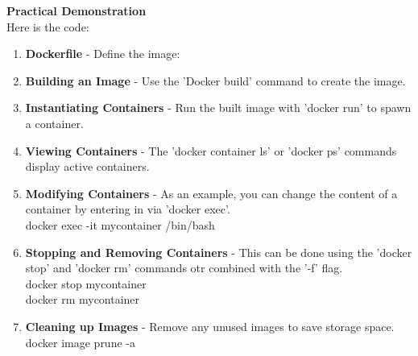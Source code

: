 \documentclass{article}
\begin{document}
\textbf{Practical Demonstration} \\
Here is the code:
\begin{enumerate}
    \item \textbf{Dockerfile} - Define the image:
    \item \textbf{Building an Image} - Use the 'Docker build' command to create the image.
    \item \textbf{Instantiating Containers} - Run the built image with 'docker run' to spawn a container.
    \item \textbf{Viewing Containers} - The 'docker container ls' or 'docker ps' commands display active containers.
    \item \textbf{Modifying Containers} - As an example, you can change the content of a container by entering in via 'docker exec'. \\
    docker exec -it mycontainer /bin/bash
    \item \textbf{Stopping and Removing Containers} - This can be done using the 'docker stop' and 'docker rm' commands otr combined with the '-f' flag. \\
    docker stop mycontainer \\
    docker rm mycontainer 
    \item \textbf{Cleaning up Images} - Remove any unused images to save storage space. \\
    docker image prune -a
\end{enumerate}
\end{document}
